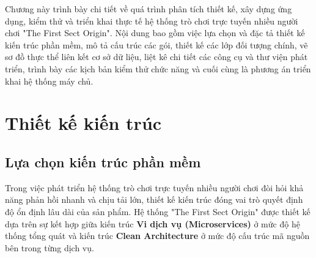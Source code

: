 \documentclass[../Project.tex]{subfiles}
\begin{document}
Chương này trình bày chi tiết về quá trình phân tích thiết kế, xây dựng ứng dụng, kiểm thử và triển khai thực tế hệ thống trò chơi trực tuyến nhiều người chơi "The First Sect Origin". Nội dung bao gồm việc lựa chọn và đặc tả thiết kế kiến trúc phần mềm, mô tả cấu trúc các gói, thiết kế các lớp đối tượng chính, vẽ sơ đồ thực thể liên kết cơ sở dữ liệu, liệt kê chi tiết các công cụ và thư viện phát triển, trình bày các kịch bản kiểm thử chức năng và cuối cùng là phương án triển khai hệ thống máy chủ.

\section{Thiết kế kiến trúc}
\label{sec:thiet_ke_kien_truc}

\subsection{Lựa chọn kiến trúc phần mềm}
\label{sec:lua_chon_kien_truc}

Trong việc phát triển hệ thống trò chơi trực tuyến nhiều người chơi đòi hỏi khả năng phản hồi nhanh và chịu tải lớn, thiết kế kiến trúc đóng vai trò quyết định độ ổn định lâu dài của sản phẩm. Hệ thống "The First Sect Origin" được thiết kế dựa trên sự kết hợp giữa kiến trúc \textbf{Vi dịch vụ (Microservices)} ở mức độ hệ thống tổng quát và kiến trúc \textbf{Clean Architecture} ở mức độ cấu trúc mã nguồn bên trong từng dịch vụ.
\end{document}
